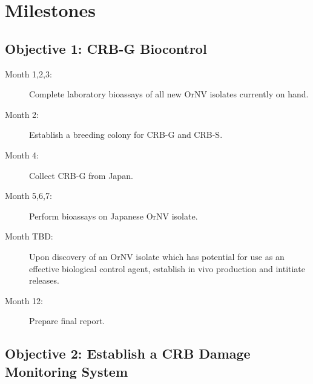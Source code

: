 \documentclass[14pt,english,letterpaper]{scrartcl}
\begin{document}
\section{Milestones} 


\subsection{Objective 1: CRB-G Biocontrol}

\begin{description}
	
	\item[Month 1,2,3:] Complete laboratory bioassays of all new OrNV isolates currently on hand.
	
	\item[Month 2:] Establish a breeding colony for CRB-G and CRB-S.
	
	\item[Month 4:] Collect CRB-G from Japan.
	
	\item[Month 5,6,7:] Perform bioassays on Japanese OrNV isolate.
	
	\item[Month TBD:] Upon discovery of an OrNV isolate which has potential for use as an effective biological control agent, establish in vivo production and intitiate releases.
	
	\item[Month 12:] Prepare final report.
\end{description}


\subsection{Objective 2: Establish a CRB Damage Monitoring System}
\end{document}
